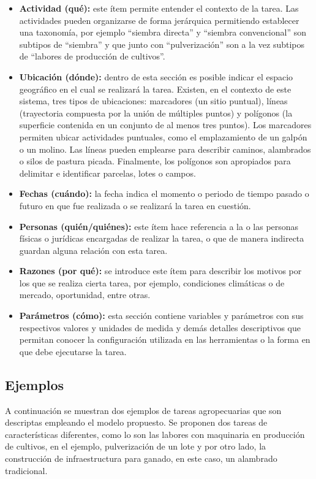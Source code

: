 \begin{itemize}
    \item \textbf{Actividad (qué):} este ítem permite entender el contexto de la tarea. Las actividades pueden organizarse de forma jerárquica permitiendo establecer una taxonomía, por ejemplo ``siembra directa'' y ``siembra convencional'' son subtipos de ``siembra'' y que junto con ``pulverización'' son a la vez subtipos de ``labores de producción de cultivos''.
    \item \textbf{Ubicación (dónde):} dentro de esta sección es posible indicar el espacio geográfico en el cual se realizará la tarea. Existen, en el contexto de este sistema, tres tipos de ubicaciones: marcadores (un sitio puntual), líneas (trayectoria compuesta por la unión de múltiples puntos) y  polígonos (la superficie contenida en un conjunto de al menos tres puntos). Los marcadores permiten ubicar actividades puntuales, como el emplazamiento de un galpón o un molino. Las líneas pueden emplearse para describir caminos, alambrados o silos de pastura picada. Finalmente, los polígonos son apropiados para delimitar e identificar parcelas, lotes o campos.
    \item \textbf{Fechas (cuándo):} la fecha indica el momento o periodo de tiempo pasado o futuro en que fue realizada o se realizará la tarea en cuestión.
    \item \textbf{Personas (quién/quiénes):} este ítem hace referencia a la o las personas físicas o jurídicas encargadas de realizar la tarea, o que de manera indirecta guardan alguna relación con esta tarea.
    \item \textbf{Razones (por qué):} se introduce este ítem para describir los motivos por los que se realiza cierta tarea, por ejemplo, condiciones climáticas o de mercado, oportunidad, entre otras.
    \item \textbf{Parámetros (cómo):} esta sección contiene variables y parámetros con sus respectivos valores y unidades de medida y demás detalles descriptivos que permitan conocer la configuración utilizada en las herramientas o la forma en que debe ejecutarse la tarea.
\end{itemize}

\subsection{Ejemplos}
A continuación se muestran dos ejemplos de tareas agropecuarias que son descriptas empleando el modelo propuesto. Se proponen dos tareas de características diferentes, como lo son las labores con maquinaria en producción de cultivos, en el ejemplo, pulverización de un lote y por otro lado, la construcción de infraestructura para ganado, en este caso, un alambrado tradicional.

